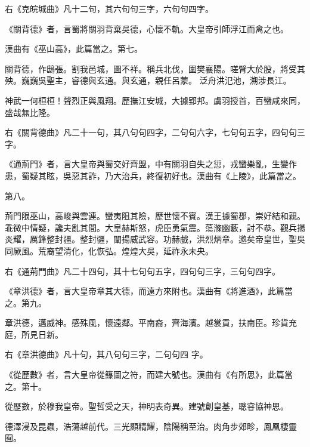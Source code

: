 \begin{pinyinscope}
 右《克皖城曲》凡十二句，其六句句三字，六句句四字。



 《關背德》者，言蜀將關羽背棄吳德，心懷不軌。大皇帝引師浮江而禽之也。



 漢曲有《巫山高》，此篇當之。第七。



 關背德，作鴟張。割我邑城，圖不祥。稱兵北伐，圍樊襄陽。嗟臂大於股，將受其殃。巍巍吳聖主，睿德與玄通。與玄通，親任呂蒙。
 泛舟洪氾池，溯涉長江。



 神武一何桓桓！聲烈正與風翔。歷撫江安城，大據郢邦。虜羽授首，百蠻咸來同，盛哉無比隆。



 右《關背德曲》凡二十一句，其八句句四字，二句句六字，七句句五字，四句句三字。



 《通荊門》者，言大皇帝與蜀交好齊盟，中有關羽自失之愆，戎蠻樂亂，生變作患，蜀疑其眩，吳惡其詐，乃大治兵，終復初好也。漢曲有《上陵》，此篇當之。



 第八。



 荊門限巫山，高峻與雲連。蠻夷阻其險，歷世懷不賓。漢王據蜀郡，崇好結和親。乖微中情疑，讒夫亂其間。大皇赫斯怒，虎臣勇氣震。蕩滌幽藪，討不恭。觀兵揚炎耀，厲鋒整封疆。整封疆，闡揚威武容。功赫戲，洪烈炳章。邈矣帝皇世，聖吳同厥風。荒裔望清化，化恢弘。煌煌大吳，延祚永未央。



 右《通荊門曲》凡二十四句，其十七句句五字，四句句三字，三句句四字。



 《章洪德》者，言大皇帝章其大德，而遠方來附也。漢曲有《將進酒》，此篇當之。第九。



 章洪德，邁威神。感殊風，懷遠鄰。平南裔，齊海濱。越裳貢，扶南臣。珍貨充庭，所見日新。



 右《章洪德曲》凡十句，其八句句三字，二句句四
 字。



 《從歷數》者，言大皇帝從籙圖之符，而建大號也。漢曲有《有所思》，此篇當之。第十。



 從歷數，於穆我皇帝。聖哲受之天，神明表奇異。建號創皇基，聰睿協神思。



 德澤浸及昆蟲，浩蕩越前代。三光顯精耀，陰陽稱至治。肉角步郊畛，鳳凰棲靈囿。




\end{pinyinscope}
